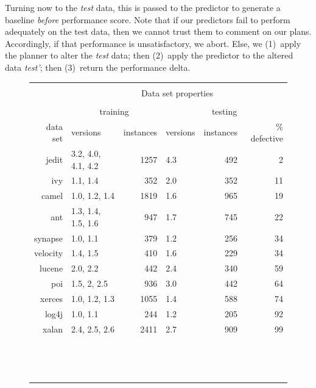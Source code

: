 \documentclass[conference]{IEEEtran}
\begin{document}
Turning now to the {\em test} data, this is passed to the { predictor}
to generate a baseline {\em before} performance score.
Note that if our { predictors} fail to perform adequately on the test data,
then we cannot trust them to comment on our plans. Accordingly,
if that performance is unsatisfactory, we abort.
Else, we (1)~apply the { planner} to alter the {\em test} data;
then (2)~apply the { predictor} to the altered data {\em test'};
then (3)~return the performance delta.




\begin{figure}[!t]
\scriptsize
   \begin{center}
   \begin{minipage}{.46\linewidth}
    \begin{tabular}{r@{~}|l@{~}|r@{~}|l@{~}|r@{~}|r@{~}|} \cline{2-6}
   & \multicolumn{5}{c|}{ }\\ 
   
   & \multicolumn{5}{c|}{ Data set  properties}\\ 
   & \multicolumn{5}{c|}{  }\\ 
           & \multicolumn{2}{c|}{training}   & \multicolumn{3}{c|}{testing}      \\ \cline{2-6}
   data set      & versions           & instances & versions     & instances    & \% defective             \\ \hline
        jedit    & 3.2, 4.0, 4.1, 4.2 & 1257      & 4.3          & 492          & 2 \\
        ivy      & 1.1, 1.4           & 352       & 2.0          & 352          & 11 \\
        camel    & 1.0, 1.2, 1.4      & 1819      & 1.6          & 965          & 19 \\
        ant      & 1.3, 1.4, 1.5, 1.6 & 947       & 1.7          & 745          & 22 \\
        synapse  & 1.0, 1.1           & 379       & 1.2          & 256          & 34 \\
        velocity & 1.4, 1.5           & 410       & 1.6          & 229          & 34 \\
        lucene   & 2.0, 2.2           & 442       & 2.4          & 340          & 59 \\
        poi      & 1.5, 2, 2.5        & 936       & 3.0          & 442          & 64 \\
        xerces   & 1.0, 1.2, 1.3      & 1055      & 1.4          & 588          & 74  \\ 
        log4j    & 1.0, 1.1           & 244       & 1.2          & 205          & 92   \\
        xalan    & 2.4, 2.5, 2.6      & 2411      & 2.7          & 909          & 99  \\\hline
        \multicolumn{6}{c}{~}\\
        \multicolumn{6}{c}{~}\\
        \multicolumn{6}{c}{~}\\
        

\end{tabular}
\end{minipage}
\end{center}
\end{figure}
\end{document}
